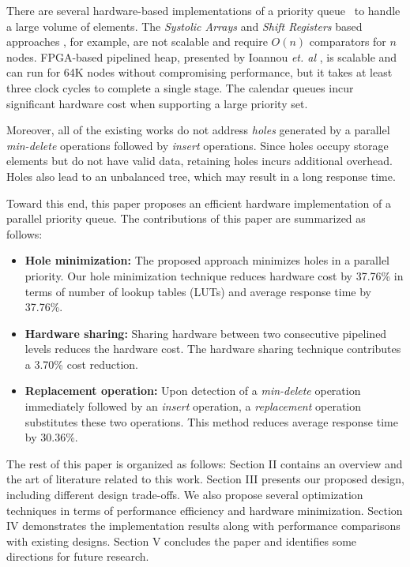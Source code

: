 \documentclass[10pt, conference, compsocconf]{IEEEtran}
\begin{document}
There are several hardware-based implementations of a priority queue~\cite{hw1,hw2,hw8,hw9,fpga1,fpga2,fpga3} to handle a large volume of elements.
The {\it Systolic Arrays} and {\it Shift Registers} based approaches \cite{hw8,hw9}, for example, are not scalable and require $O(n)$ comparators for $n$ nodes.
FPGA-based pipelined heap, presented by Ioannou {\it et. al} \cite{fpga1}, is scalable and can run for 64K nodes without compromising performance, but it takes at least three clock cycles to complete a single stage.
The calendar queues \cite{hw1} incur significant hardware cost when supporting a large priority set.

Moreover, all of the existing works do not address {\it holes} generated by a parallel {\it min-delete} operations followed by {\it insert} operations.
Since holes occupy storage elements but do not have valid data, retaining holes incurs additional overhead.
Holes also lead to an unbalanced tree, which may result in a long response time.

Toward this end, this paper proposes an efficient hardware implementation of a parallel priority queue.
The contributions of this paper are summarized as follows:
\begin{itemize}
\item {\bf Hole minimization:} The proposed approach minimizes holes in a parallel priority. Our hole minimization technique reduces hardware cost by 37.76\% in terms of number of lookup tables (LUTs) and average response time by 37.76\%.
\item {\bf Hardware sharing:} Sharing hardware between two consecutive pipelined levels reduces the hardware cost. The hardware sharing technique contributes a 3.70\% cost reduction.
\item {\bf Replacement operation:} Upon detection of a {\it min-delete} operation immediately followed by an {\it insert} operation, a {\it replacement} operation substitutes these two operations. This method reduces average response time by 30.36\%.
\end{itemize}

The rest of this paper is organized as follows: Section II contains an overview and the art of literature related to this work.
Section III presents our proposed design, including different design trade-offs. We also propose several optimization techniques in terms of performance efficiency and hardware minimization.
Section IV demonstrates the implementation results along with performance comparisons with existing designs.
Section V concludes the paper and identifies some directions for future research.
\end{document}
